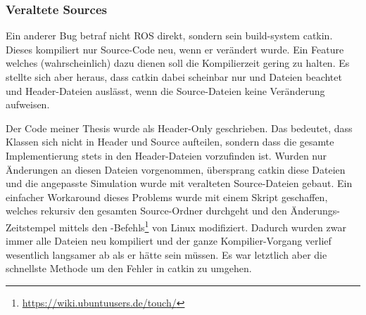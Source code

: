 \subsubsection*{Veraltete Sources}
Ein anderer Bug betraf nicht ROS direkt, sondern sein build-system catkin. Dieses kompiliert nur Source-Code neu, wenn er verändert wurde. Ein Feature welches (wahrscheinlich) dazu dienen soll die Kompilierzeit gering zu halten. Es stellte sich aber heraus, dass catkin dabei scheinbar nur  und  Dateien beachtet und Header-Dateien auslässt, wenn die Source-Dateien keine Veränderung aufweisen.

Der Code meiner Thesis wurde als Header-Only geschrieben. Das bedeutet, dass Klassen sich nicht in Header und Source aufteilen, sondern dass die gesamte Implementierung stets in den Header-Dateien vorzufinden ist. Wurden nur Änderungen an diesen Dateien vorgenommen, übersprang catkin diese Dateien und die angepasste Simulation wurde mit veralteten Source-Dateien gebaut. Ein einfacher Workaround dieses Problems wurde mit einem Skript geschaffen, welches rekursiv den gesamten Source-Ordner durchgeht und den Änderungs-Zeitstempel mittels den -Befehls\footnote{\url{https://wiki.ubuntuusers.de/touch/}} von Linux modifiziert. Dadurch wurden zwar immer alle Dateien neu kompiliert und der ganze Kompilier-Vorgang verlief wesentlich langsamer ab als er hätte sein müssen. Es war letztlich aber die schnellste Methode um den Fehler in catkin zu umgehen.

